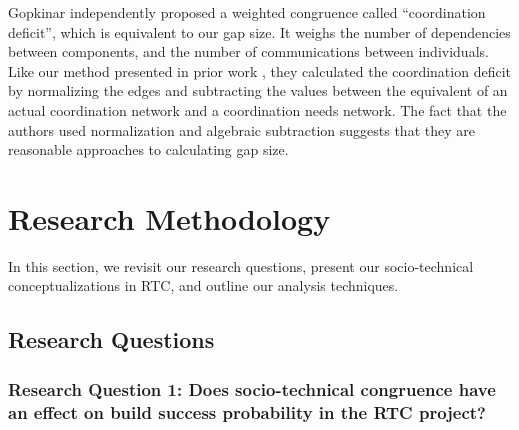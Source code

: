 \documentclass[12pt,oneside]{book}
\begin{document}
Gopkinar independently proposed a weighted congruence called ``coordination deficit'', which is equivalent to our gap size. It weighs the number of dependencies between components, and the number of communications between individuals. Like our method presented in prior work \cite{kwan2009:weighted}, they calculated the coordination deficit by normalizing the edges and subtracting the values between the equivalent of an actual coordination network and a coordination needs network. The fact that the authors used normalization and algebraic subtraction suggests that they are reasonable approaches to calculating gap size.



\section{Research Methodology}
\label{sec:methodology}

In this section, we revisit our research questions, present our socio-technical
conceptualizations in RTC, and outline our analysis techniques.

\subsection{Research Questions}



\subsubsection*{Research Question 1: Does socio-technical congruence have an effect on build success probability in the RTC project?}
\end{document}
